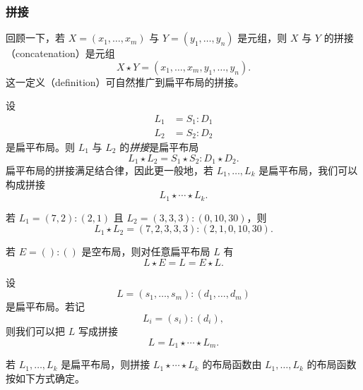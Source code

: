 \subsubsection{拼接}

\noindent 回顾一下，若 $X= (x_1,\dots,x_m)$ 与 $Y  = (y_1,\dots,y_n)$ 是元组，则 $X$ 与 $Y$ 的拼接（concatenation）是元组
    \[
    X \star Y = (x_1,\dots,x_m,y_1,\dots,y_n).
    \]
这一定义（definition）可自然推广到扁平布局的拼接。

\begin{definition}\label{definitionofflatconcatenate}
    设
    \begin{align*}
        L_1 & = S_1:D_1\\
        L_2 & = S_2:D_2
    \end{align*}
    是扁平布局。则 $L_1$ 与 $L_2$ 的{\it 拼接}是扁平布局
    \[
    L_1 \star L_2 = S_1 \star S_2 : D_1 \star D_2.
    \]
    扁平布局的拼接满足结合律，因此更一般地，若 $L_1,\dots,L_k$ 是扁平布局，我们可以构成拼接
    \[
    L_1 \star \cdots \star L_k.
    \]
\end{definition}

\begin{example}\label{flatconcatenateexample1}
    若 $L_1 = (7,2):(2,1)$ 且 $L_2 = (3,3,3):(0,10,30)$，则
    \[
    L_1 \star L_2 = (7,2,3,3,3):(2,1,0,10,30).
    \]
\end{example}

\begin{example}\label{flatconcatenateexample2}
    若 $E = ():()$ 是空布局，则对任意扁平布局 $L$ 有
    \[
    L \star E = L = E \star L.
    \]
\end{example}

\begin{observation}
    设
    \[
    L = (s_1,\dots,s_m):(d_1,\dots,d_m)
    \]
    是扁平布局。若记
    \[L_i = (s_i):(d_i),\]
    则我们可以把 $L$ 写成拼接
    \[
    L = L_1 \star \cdots \star L_m.
    \]
\end{observation}

若 $L_1,\dots,L_k$ 是扁平布局，则拼接 $L_1 \star \cdots \star L_k$ 的布局函数由 $L_1,\dots,L_k$ 的布局函数按如下方式确定。


